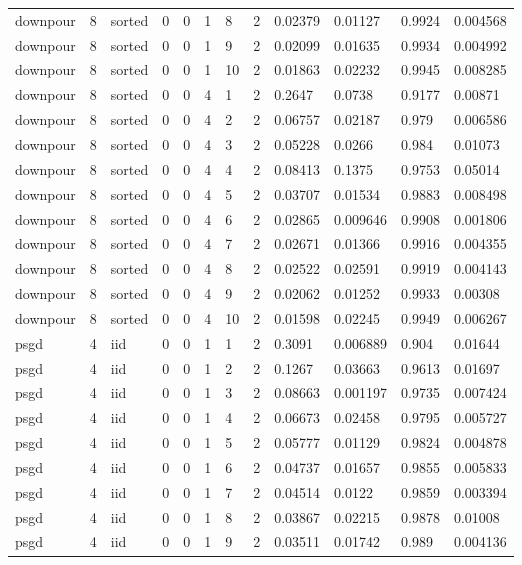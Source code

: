 \begin{tabular}{llllllllllll}
downpour & 8 & sorted & 0 & 0 & 1 & 8 & 2 & 0.02379 & 0.01127 & 0.9924 & 0.004568 \\
downpour & 8 & sorted & 0 & 0 & 1 & 9 & 2 & 0.02099 & 0.01635 & 0.9934 & 0.004992 \\
downpour & 8 & sorted & 0 & 0 & 1 & 10 & 2 & 0.01863 & 0.02232 & 0.9945 & 0.008285 \\
downpour & 8 & sorted & 0 & 0 & 4 & 1 & 2 & 0.2647 & 0.0738 & 0.9177 & 0.00871 \\
downpour & 8 & sorted & 0 & 0 & 4 & 2 & 2 & 0.06757 & 0.02187 & 0.979 & 0.006586 \\
downpour & 8 & sorted & 0 & 0 & 4 & 3 & 2 & 0.05228 & 0.0266 & 0.984 & 0.01073 \\
downpour & 8 & sorted & 0 & 0 & 4 & 4 & 2 & 0.08413 & 0.1375 & 0.9753 & 0.05014 \\
downpour & 8 & sorted & 0 & 0 & 4 & 5 & 2 & 0.03707 & 0.01534 & 0.9883 & 0.008498 \\
downpour & 8 & sorted & 0 & 0 & 4 & 6 & 2 & 0.02865 & 0.009646 & 0.9908 & 0.001806 \\
downpour & 8 & sorted & 0 & 0 & 4 & 7 & 2 & 0.02671 & 0.01366 & 0.9916 & 0.004355 \\
downpour & 8 & sorted & 0 & 0 & 4 & 8 & 2 & 0.02522 & 0.02591 & 0.9919 & 0.004143 \\
downpour & 8 & sorted & 0 & 0 & 4 & 9 & 2 & 0.02062 & 0.01252 & 0.9933 & 0.00308 \\
downpour & 8 & sorted & 0 & 0 & 4 & 10 & 2 & 0.01598 & 0.02245 & 0.9949 & 0.006267 \\
psgd & 4 & iid & 0 & 0 & 1 & 1 & 2 & 0.3091 & 0.006889 & 0.904 & 0.01644 \\
psgd & 4 & iid & 0 & 0 & 1 & 2 & 2 & 0.1267 & 0.03663 & 0.9613 & 0.01697 \\
psgd & 4 & iid & 0 & 0 & 1 & 3 & 2 & 0.08663 & 0.001197 & 0.9735 & 0.007424 \\
psgd & 4 & iid & 0 & 0 & 1 & 4 & 2 & 0.06673 & 0.02458 & 0.9795 & 0.005727 \\
psgd & 4 & iid & 0 & 0 & 1 & 5 & 2 & 0.05777 & 0.01129 & 0.9824 & 0.004878 \\
psgd & 4 & iid & 0 & 0 & 1 & 6 & 2 & 0.04737 & 0.01657 & 0.9855 & 0.005833 \\
psgd & 4 & iid & 0 & 0 & 1 & 7 & 2 & 0.04514 & 0.0122 & 0.9859 & 0.003394 \\
psgd & 4 & iid & 0 & 0 & 1 & 8 & 2 & 0.03867 & 0.02215 & 0.9878 & 0.01008 \\
psgd & 4 & iid & 0 & 0 & 1 & 9 & 2 & 0.03511 & 0.01742 & 0.989 & 0.004136 \\

\end{tabular}
